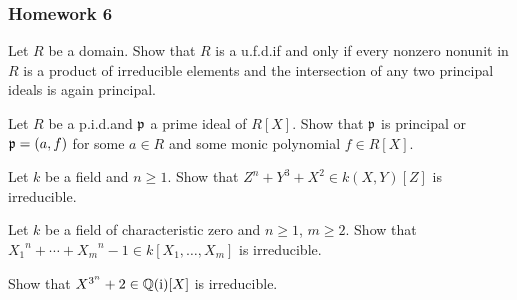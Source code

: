 \subsubsection{Homework 6}
\setcounter{exercise}{0}
\setcounter{equation}{0}

\begin{problem}
  Let \(R\) be a domain. Show that \(R\) is a u.f.d.\@ if and only if every
  nonzero nonunit in \(R\) is a product of irreducible elements and the
  intersection of any two principal ideals is again principal.
\end{problem}
\begin{solution}
\end{solution}

\begin{problem}
  Let \(R\) be a p.i.d.\@ and \(\mathfrak{p}\) a prime ideal of \(R[X]\). Show
  that \(\mathfrak{p}\) is principal or \(\mathfrak{p}=(a,f)\) for some \(a\in R\) and
  some monic polynomial \(f\in R[X]\).
\end{problem}
\begin{solution}
\end{solution}

\begin{problem}
  Let \(k\) be a field and \(n\geq 1\). Show that
  \(Z^n+Y^3+X^2\in k(X,Y)[Z]\) is irreducible.
\end{problem}
\begin{solution}
\end{solution}

\begin{problem}
  Let \(k\) be a field of characteristic zero and \(n\geq 1\), \(m\geq
  2\). Show that \({X_1}^n+\dotsb+{X_m}^n-1\in k[X_1,\dotsc,X_m]\) is
  irreducible.
\end{problem}
\begin{solution}
\end{solution}

\begin{problem}
  Show that \(X^{3^n}+2\in\mathbb{Q}(\mathrm{i})[X]\) is irreducible.
\end{problem}
\begin{solution}
\end{solution}

